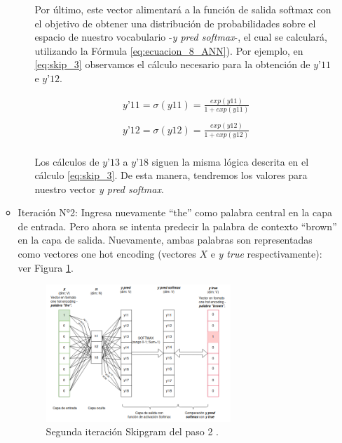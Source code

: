 \documentclass[12pt,a4paper]{article}
\begin{document}
\begin{sloppypar}
\begin{enumerate}
\begin{itemize}
\begin{itemize}
Por último, este vector alimentará a la función de salida softmax con el objetivo de obtener una distribución de probabilidades sobre el espacio de nuestro vocabulario -\textit{y pred softmax}-, el cual se calculará, utilizando la Fórmula \ref{eq:ecuacion_8_ANN}). Por ejemplo, en \ref{eq:skip_3} observamos el cálculo necesario para la obtención de $y’11$ e $y’12$.

\begin{equation}\label{eq:skip_3}
\begin{gathered}
y’11 = \sigma(y11) = \frac{exp(y11)}{1 + exp(y11)} \\ \\
y’12 = \sigma(y12) = \frac{exp(y12)}{1 + exp(y12)}
\end{gathered}
\end{equation}
\\
Los cálculos de $y’13$ a $y’18$ siguen la misma lógica descrita en el cálculo \ref{eq:skip_3}. De esta manera, tendremos los valores para nuestro vector \textit{y pred softmax}. 

\end{itemize}

\item Iteración N°2: Ingresa nuevamente “the” como palabra central en la capa de entrada. Pero ahora se intenta predecir la palabra de contexto “brown” en la capa de salida. Nuevamente, ambas palabras son representadas como vectores one hot encoding (vectores $X$ e \textit{y true} respectivamente): ver Figura \ref{fig:7_EjSkip}. 
\begin{figure}[H]    %
\centering
\includegraphics[width=0.7\textwidth]{images/Ejemplo_Skipgram/7_EjSkip.png}
\caption{Segunda iteración Skipgram del paso 2 .} 
\label{fig:7_EjSkip}
\end{figure}


\end{itemize}
\end{enumerate}
\end{sloppypar}
\end{document}
